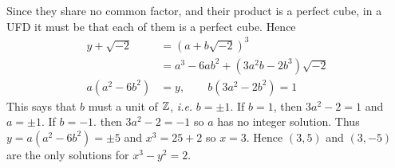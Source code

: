 \documentclass[12pt,class=article,crop=false]{standalone}
\begin{document}
\begin{problem}[5]
\begin{enumerate}[label=(\alph*)]
	Since they share no common factor, and their product is a perfect cube, in a UFD it must be that each of them is a perfect cube. Hence
	\begin{align*}
		y+\sqrt{-2} &= (a+b\sqrt{-2} )^3 \\ 
		&= a^3 -6ab^2+(3a^2b- 2b^3)\sqrt{-2} \\
		a(a^2-6b^2)&=y, \qquad b(3a^2-2b^2) = 1
	\end{align*}
	This says that $b$ must a unit of  $ \mathbb{Z}$, \emph{i.e.} $ b = \pm 1$. If $ b=1$, then  $ 3a^2-2 = 1$ and $ a=\pm 1$. If  $ b=-1$. then  $ 3a^2-2=-1$ so $ a$ has no integer solution. Thus $ y=a(a^2-6b^2) = \pm 5$ and $ x^3 = 25 +2 $ so $ x = 3$. Hence  $ (3,5)$ and  $ (3,-5)$ are the only solutions for $ x^3-y^2=2$.
	\end{enumerate}
	\end{problem}
\end{document}
